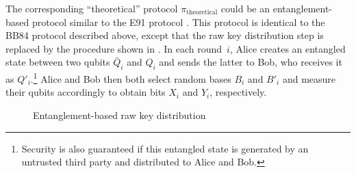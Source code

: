 The corresponding ``theoretical'' protocol $\pi_{\mathrm{theoretical}}$ could be an entanglement-based protocol similar to the E91 protocol \cite{Eke91}. This protocol is identical to the BB84 protocol described above, except that the raw key distribution step is replaced by the procedure shown in . In each round~$i$, Alice creates an entangled state between two qubits $\bar{Q}_i$ and $Q_i$ and sends the latter to Bob, who receives it as $Q'_i$.\footnote{Security is also guaranteed if this entangled state is generated by an untrusted third party and distributed to Alice and Bob.}  Alice and Bob then both select random bases $B_i$ and $B'_i$ and measure their qubits accordingly to obtain bits $X_i$ and $Y_i$, respectively. 

\begin{figure}[h]
\noindent{}
\caption{Entanglement-based raw key distribution \label{fig:EntanglementBasedRawKeyDistribution}}
\end{figure}

